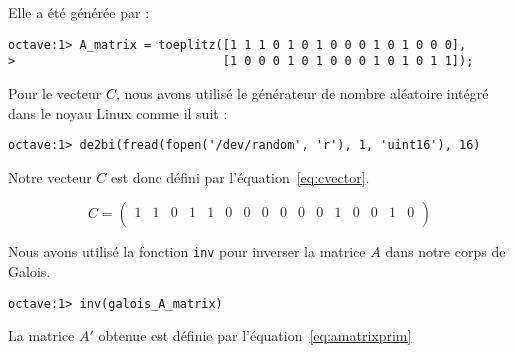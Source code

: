 \documentclass[12pt,a4paper]{report}
\begin{document}
Elle a été générée par :

\begin{verbatim}
octave:1> A_matrix = toeplitz([1 1 1 0 1 0 1 0 0 0 1 0 1 0 0 0],
>                             [1 0 0 0 1 0 1 0 0 0 1 0 1 0 1 1]);
\end{verbatim}

Pour le vecteur $C$, nous avons utilisé le générateur de nombre aléatoire intégré dans le
noyau Linux comme il suit :

\begin{verbatim}
octave:1> de2bi(fread(fopen('/dev/random', 'r'), 1, 'uint16'), 16)
\end{verbatim}

Notre vecteur $C$ est donc défini par l'équation~\ref{eq:cvector}.

\begin{equation}
\label{eq:cvector}
C = \left(
\begin{array}{cccccccccccccccc}
1 & 1 & 0 & 1 & 1 & 0 & 0 & 0 & 0 & 0 & 0 & 1 & 0 & 0 & 1 & 0 \\
\end{array}
\right)
\end{equation}

Nous avons utilisé la fonction \verb|inv| pour inverser la matrice $A$ dans
notre corps de Galois.

\begin{verbatim}
octave:1> inv(galois_A_matrix)
\end{verbatim}

La matrice $A'$ obtenue est définie par l'équation~\ref{eq:amatrixprim}
\end{document}
